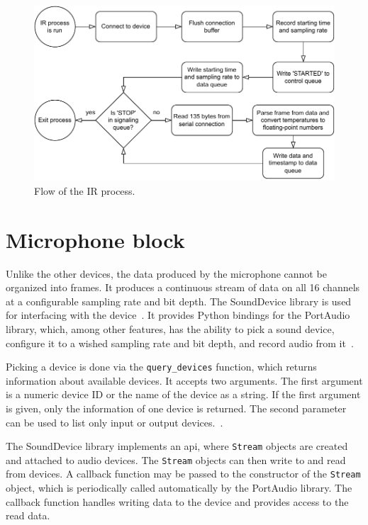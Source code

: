 \begin{figure}
    \centering
    \includegraphics[width=\textwidth]{fig/3/ir-flowchart.pdf}
    \caption{Flow of the IR process.}
    \label{fig:3-ir-flowchart}
\end{figure}

\section{Microphone block}
\label{sec:3-mic}
Unlike the other devices, the data produced by the microphone cannot be organized into frames.
It produces a continuous stream of data on all 16 channels at a configurable sampling rate and bit depth.
The SoundDevice library is used for interfacing with the device~\cite{sounddevice-docs}.
It provides Python bindings for the PortAudio library,
which, among other features, has the ability to pick a sound device,
configure it to a wished sampling rate and bit depth, and record audio from it~\cite{portaudio}.

Picking a device is done via the \texttt{query\_devices} function,
which returns information about available devices.
It accepts two arguments.
The first argument is a numeric device ID or the name of the device as a string.
If the first argument is given, only the information of one device is returned.
The second parameter can be used to list only input or output devices.~\cite{sounddevice-docs}.

The SoundDevice library implements an \gls{api}, where \texttt{Stream} objects are created and attached to audio devices.
The \texttt{Stream} objects can then write to and read from devices.
A callback function may be passed to the constructor of the \texttt{Stream} object,
which is periodically called automatically by the PortAudio library.
The callback function handles writing data to the device and provides access to the read data.~\cite{sounddevice-docs-stream}

